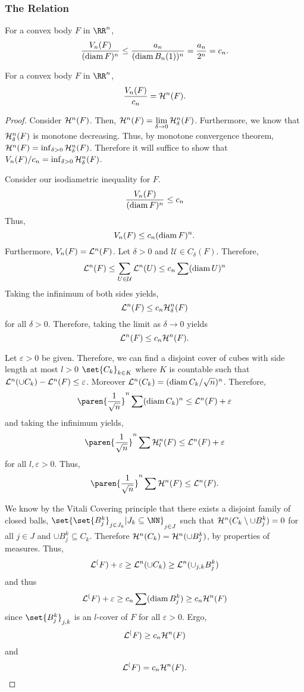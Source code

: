 \subsubsection{The Relation}

\begin{thm}
	For a convex body $F$ in $\RR^n$,
	\[
		\frac{V_n(F)}{(\operatorname{diam} F)^n} \leq \frac{a_n}{(\operatorname{diam} B_n(1))^n}=\frac{a_n}{2^n}=c_n.
	\]
\end{thm}

\begin{thm}
	For a convex body $F$ in $\RR^n$,
	\[
		\frac{V_n(F)}{c_n} = \mathcal{H}^n(F).
	\]
\end{thm}
\begin{proof}
	Consider $\mathcal{H}^n(F)$.
	Then, $\mathcal{H}^n (F) = \lim\limits_{\delta\rightarrow0} \mathcal{H}^n_\delta (F)$.
	Furthermore, we know that $\mathcal{H}^n_\delta(F)$ is monotone decreasing.
	Thus, by monotone convergence theorem, $\mathcal{H}^n(F)=\inf_{\delta>0} \mathcal{H}^n_\delta(F)$.
	Therefore it will suffice to show that $V_n(F)/c_n = \inf_{\delta>0} \mathcal{H}^n_\delta(F)$.

	Consider our isodiametric inequality for $F$.
	\[
		\frac{V_n(F)}{(\operatorname{diam} F)^n} \leq c_n
	\]
	Thus,
	\[
		V_n(F) \leq c_n(\operatorname{diam} F)^n.
	\]
	Furthermore, $V_n(F)=\mathcal{L}^n(F)$.
	Let $\delta>0$ and $\mathcal{U}\in C_\delta(F)$.
	Therefore,
	\[
		\mathcal{L}^n(F) \leq \sum_{U\in\mathcal{U}} \mathcal{L}^n(U) \leq c_n\sum (\operatorname{diam} U)^n
	\]
	Taking the infinimum of both sides yields,
	\[
		\mathcal{L}^n(F)\leq c_n\mathcal{H}^n_\delta(F)
	\]
	for all $\delta>0$.
	Therefore, taking the limit as $\delta\rightarrow0$ yields
	\[
		\mathcal{L}^n(F)\leq c_n\mathcal{H}^n(F).
	\]

	Let $\varepsilon>0$ be given.
	Therefore, we can find a disjoint cover of cubes with side length at most $l>0$ $\set{C_k}_{k\in K}$ where $K$ is countable such that $\mathcal{L}^n(\cup C_k) -\mathcal{L}^n(F) \leq \varepsilon$.
	Moreover $\mathcal{L}^n(C_k) = (\operatorname{diam} C_k / \sqrt{n})^n$.
	Therefore,
	\[
		\paren{\frac{1}{\sqrt{n}}}^n \sum (\diam C_k)^n \leq \lm^n(F) + \varepsilon
	\]
	and taking the infinimum yields,
	\[
		\paren{\frac{1}{\sqrt{n}}}^n \sum \hm^n_l(F) \leq \lm^n(F) + \varepsilon
	\]
	for all $l,\varepsilon > 0$.
	Thus,
	\[
		\paren{\frac{1}{\sqrt{n}}}^n \sum \hm^n(F) \leq \lm^n(F).
	\]

	We know by the Vitali Covering principle that there exists a disjoint family of closed balls, $\set{\set{B_j^k}_{j\in J_k} | J_k\subseteq\NN}_{j\in J}$ such that $\mathcal{H}^n(C_k\setminus \cup B_j^k)=0$ for all $j\in J$ and $\cup B_j^k \subseteq C_k$.
	Therefore $\mathcal{H}^n(C_k) = \mathcal{H}^n(\cup B_j^k)$, by properties of measures.
	Thus,
	\[
		\mathcal{L}^(F) + \varepsilon \geq \mathcal{L}^n(\cup C_k) \geq \mathcal{L}^n(\cup_{j,k} B_j^k)
	\]
	and thus
	\[
		\mathcal{L}^(F) + \varepsilon \geq c_n \sum (\operatorname{diam} B_j^k)\geq c_n\mathcal{H}^n(F)
	\]
	since $\set{B_j^k}_{j,k}$ is an $l$-cover of $F$ for all $\varepsilon >0$.
	Ergo,
	\[
		\mathcal{L}^(F) \geq  c_n\mathcal{H}^n(F)
	\]
	and
	\[
		\mathcal{L}^(F) =  c_n\mathcal{H}^n(F).
	\]
\end{proof}

